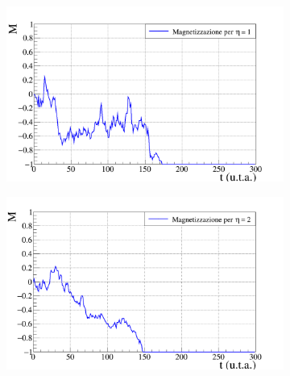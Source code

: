 \documentclass[letterpaper,10pt]{article}
\begin{document}
\begin{figure}[h]
\centering
\begin{subfigure}{0.95\textwidth}
\includegraphics[width=\linewidth]{Immagini/partial_magn_graph_v1.png}
\end{subfigure}
\begin{subfigure}{0.95\textwidth}
\includegraphics[width=\linewidth]{Immagini/partial_magn_graph_v2.png}
\end{subfigure}
\end{figure}
\end{document}
